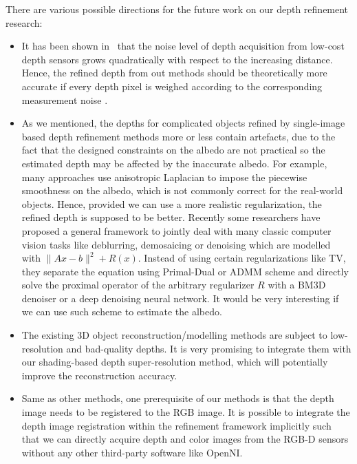 There are various possible directions for the future work on our depth refinement research:
\begin{itemize}
    \item It has been shown in~\cite{khoshelham2012accuracy} that the noise level of depth acquisition from low-cost depth sensors grows quadratically with respect to the increasing distance.
    Hence, the refined depth from out methods should be theoretically more accurate if every depth pixel is weighed according to the corresponding measurement noise .
    
    \item As we mentioned, the depths for complicated objects refined by single-image based depth refinement methods more or less contain artefacts, due to the fact that the designed constraints on the albedo are not practical so the estimated depth may be affected by the inaccurate albedo.
    For example, many approaches use anisotropic Laplacian to impose the piecewise smoothness on the albedo, which is not commonly correct for the real-world objects.
    Hence, provided we can use a more realistic regularization, the refined depth is supposed to be better.
    Recently some researchers have proposed a general framework to jointly deal with many classic computer vision tasks like deblurring, demosaicing or denoising which are modelled with $\lVert Ax - b\rVert^2 + R(x)$.
    Instead of using certain regularizations like TV, they separate the equation using Primal-Dual or ADMM scheme and directly solve the proximal operator of the arbitrary regularizer $R$ with a BM3D denoiser\cite{heide2014flexisp} or a deep denoising neural network\cite{meinhardt2017learning}.
    It would be very interesting if we can use such scheme to estimate the albedo. 

    \item The existing 3D object reconstruction/modelling methods are subject to low-resolution and bad-quality depths.
             It is very promising to integrate them with our shading-based depth super-resolution method, which will potentially improve the reconstruction accuracy.   
     
    \item Same as other methods, one prerequisite of our methods is that the depth image needs to be registered to the RGB image.
    It is possible to integrate the depth image registration within the refinement framework implicitly such that we can directly acquire depth and color images from the RGB-D sensors without any other third-party software like OpenNI.
             
\end{itemize}







